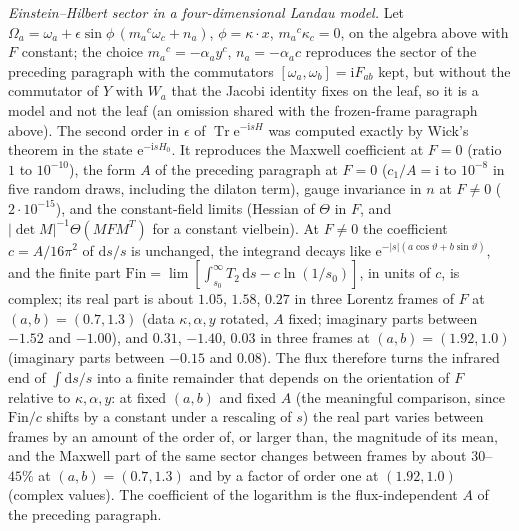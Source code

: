 \emph{Einstein--Hilbert sector in a four-dimensional Landau model.} Let \(\Omega_a=\omega_a+\epsilon\sin\phi\,(m_a{}^c\omega_c+n_a)\), \(\phi=\kappa\cdot x\), \(m_a{}^c\kappa_c=0\), on the algebra above with \(F\) constant; the choice \(m_a{}^c=-\alpha_ay^c\), \(n_a=-\alpha_a c\) reproduces the sector of the preceding paragraph with the commutators \([\omega_a,\omega_b]=\mathrm iF_{ab}\) kept, but without the commutator of \(Y\) with \(W_a\) that the Jacobi identity fixes on the leaf, so it is a model and not the leaf (an omission shared with the frozen-frame paragraph above). The second order in \(\epsilon\) of \(\operatorname{Tr}\mathrm e^{-\mathrm isH}\) was computed exactly by Wick's theorem in the state \(\mathrm e^{-\mathrm isH_0}\). It reproduces the Maxwell coefficient at \(F=0\) (ratio \(1\) to \(10^{-10}\)), the form \(A\) of the preceding paragraph at \(F=0\) (\(c_1/A=\mathrm i\) to \(10^{-8}\) in five random draws, including the dilaton term), gauge invariance in \(n\) at \(F\ne0\) (\(2\cdot10^{-15}\)), and the constant-field limits (Hessian of \(\Theta\) in \(F\), and \(|\det M|^{-1}\Theta(MFM^T)\) for a constant vielbein). At \(F\ne0\) the coefficient \(c=A/16\pi^2\) of \(\mathrm ds/s\) is unchanged, the integrand decays like \(\mathrm e^{-|s|(a\cos\vartheta+b\sin\vartheta)}\), and the finite part \(\mathrm{Fin}=\lim[\int_{s_0}^\infty T_2\,\mathrm ds-c\ln(1/s_0)]\), in units of \(c\), is complex; its real part is about \(1.05\), \(1.58\), \(0.27\) in three Lorentz frames of \(F\) at \((a,b)=(0.7,1.3)\) (data \(\kappa,\alpha,y\) rotated, \(A\) fixed; imaginary parts between \(-1.52\) and \(-1.00\)), and \(0.31\), \(-1.40\), \(0.03\) in three frames at \((a,b)=(1.92,1.0)\) (imaginary parts between \(-0.15\) and \(0.08\)). The flux therefore turns the infrared end of \(\int\mathrm ds/s\) into a finite remainder that depends on the orientation of \(F\) relative to \(\kappa,\alpha,y\): at fixed \((a,b)\) and fixed \(A\) (the meaningful comparison, since \(\mathrm{Fin}/c\) shifts by a constant under a rescaling of \(s\)) the real part varies between frames by an amount of the order of, or larger than, the magnitude of its mean, and the Maxwell part of the same sector changes between frames by about \(30\)--\(45\%\) at \((a,b)=(0.7,1.3)\) and by a factor of order one at \((1.92,1.0)\) (complex values). The coefficient of the logarithm is the flux-independent \(A\) of the preceding paragraph.

